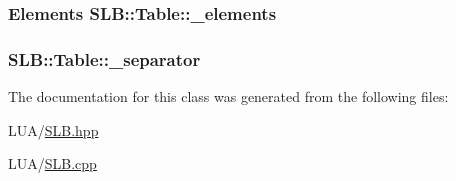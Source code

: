 \subsubsection[{\texorpdfstring{\+\_\+elements}{_elements}}]{\setlength{\rightskip}{0pt plus 5cm}Elements S\+L\+B\+::\+Table\+::\+\_\+elements\hspace{0.3cm}{\ttfamily [protected]}}\hypertarget{classSLB_1_1Table_a95ddcf8929bf42d7b3294fdc94eac87b}{}\label{classSLB_1_1Table_a95ddcf8929bf42d7b3294fdc94eac87b}
\subsubsection[{\texorpdfstring{\+\_\+separator}{_separator}}]{ S\+L\+B\+::\+Table\+::\+\_\+separator\hspace{0.3cm}{\ttfamily [private]}}\hypertarget{classSLB_1_1Table_a45ae383146c7d53a5d52e395e926f429}{}\label{classSLB_1_1Table_a45ae383146c7d53a5d52e395e926f429}


The documentation for this class was generated from the following files\+:\begin{DoxyCompactItemize}
\item 
L\+U\+A/\hyperlink{SLB_8hpp}{S\+L\+B.\+hpp}\item 
L\+U\+A/\hyperlink{SLB_8cpp}{S\+L\+B.\+cpp}\end{DoxyCompactItemize}
